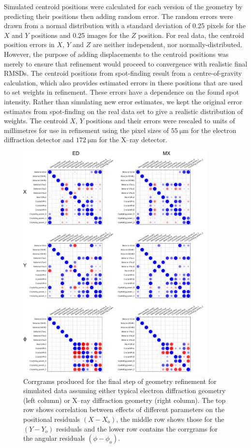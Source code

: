 \documentclass[preprint]{iucr}
\begin{document}
Simulated centroid positions were calculated for each version of the geometry
by predicting their positions then adding random error. The random errors were
drawn from a normal distribution with a standard deviation of 0.25 pixels for
the $X$ and $Y$ positions and 0.25 images for the $Z$ position. For real data,
the centroid position errors in $X$, $Y$ and $Z$ are neither independent, nor
normally-distributed. However, the purpose of adding displacements to the
centroid positions was merely to ensure that refinement would proceed to
convergence with realistic final RMSDs. The centroid positions from
spot-finding result from a centre-of-gravity calculation, which also provides
estimated errors in these positions that are used to set weights in
refinement. These errors have a dependence on the found spot intensity. Rather
than simulating new error estimates, we kept the original error
estimates from spot-finding on the real data set to give a realistic
distribution of weights. The centroid $X$, $Y$ positions and their errors were
rescaled to units of millimetres for use in refinement using the pixel sizes
of $\SI{55}{\micro\metre}$ for the electron diffraction detector and
$\SI{172}{\micro\metre}$ for the X--ray detector.

\begin{figure}
  \label{fig:corrgrams-all}
  \centering
  \caption{
    Corrgrams produced for the final step of geometry refinement for simulated
    data assuming either typical electron diffraction geometry (left column)
    or X--ray diffraction geometry (right column). The top row shows
    correlation between effects of different parameters on the positional
    residuals $(X - X_o)$, the middle row shows those for the
    $(Y - Y_o)$ residuals and the lower row contains the corrgrams for the
    angular residuals $(\phi - \phi_o)$.
  }
  \includegraphics[width=0.9\textwidth]{Figures/simulation/corrgrams_all.png}
\end{figure}
\end{document}
